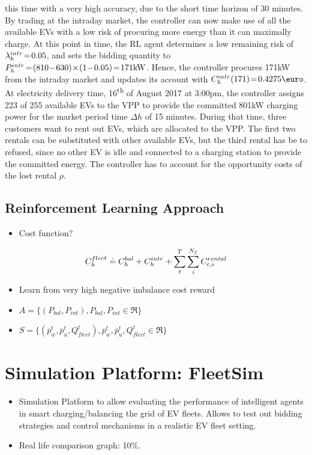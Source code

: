 \documentclass[a4paper, 12pt]{article}
\begin{document}
this time with a very high accuracy, due to the short time horizon of 30 minutes. By
trading at the intraday market, the controller can now make use of all the
available EVs with a low risk of procuring more energy than it can maximally
charge. At this point in time, the RL agent determines a low remaining risk of
\(\lambda^{intr}_{h}\!=\!0.05\), and sets the bidding quantity to
\(\Pi{h}\!=\!(810\!-\!630)\!\times\!(1\!-\!0.05)\!=\!171\kw\). Hence, the
controller procures 171kW from the intraday market and updates its account with
\(\Ci{h}(171)\!=\!0.4275\eur\). At electricity delivery time, 16\textsuperscript{th} of August
2017 at 3:00pm, the controller assigns 223 of 255 available EVs to the VPP to
provide the committed 801kW charging power for the market period time \(\Delta h\)
of 15 minutes. During that time, three customers want to rent out EVs, which
are allocated to the VPP. The first two rentals can be substituted with other
available EVs, but the third rental has be to refused, since no other EV is
idle and connected to a charging station to provide the committed energy. The
controller has to account for the opportunity costs of the lost rental \(\rho\).
\subsection{Reinforcement Learning Approach \label{sec-model-rl}}
\label{sec:org818f463}
\begin{itemize}
\item Cost function?
\end{itemize}

\begin{equation}
    C^{fleet}_{h} \doteq C^{bal}_{h} + C^{intr}_{h} + \sum_t^{T} \sum_i^{N_f} C^{rental}_{c, i}
\end{equation}

\begin{itemize}
\item Learn from very high negative imbalance cost reward

\item \(A = \{(P_{bal}, P_{int}), P_{bal}, P_{int} \in \Re \}\)
\item \(S = \{(\overline{p}_w^t, \overline{p}_u^t, Q_{fleet}^t), \overline{p}_w^t,
  \overline{p}_u^t, Q_{fleet}^t \in \Re \}\)
\end{itemize}


\section{Simulation Platform: FleetSim}
\label{sec:org887cb3c}
\begin{itemize}
\item Simulation Platform to allow evaluating the performance of intelligent agents
in smart charging/balancing the grid of EV fleets. Allows to test out bidding strategies
and control mechanisms in a realistic EV fleet setting.
\item Real life comparison graph: 10\%.
\end{itemize}
\end{document}
